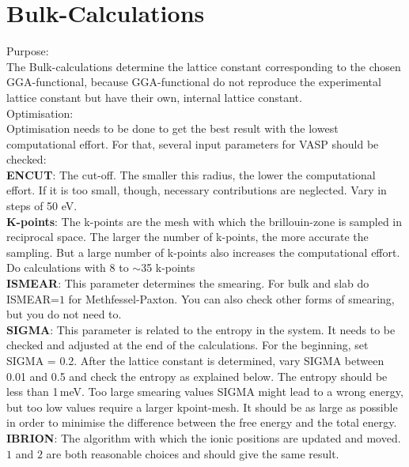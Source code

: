 \documentclass[11pt,oneside,a4paper, captions=nooneline, headsepline]{article}%
\begin{document}
\section{Bulk-Calculations}
\label{bulk}
Purpose:\\
The Bulk-calculations determine the lattice constant corresponding to the chosen GGA-functional, because GGA-functional do not reproduce the experimental lattice constant but have their own, internal lattice constant.\\
Optimisation:\\
Optimisation needs to be done to get the best result with the lowest computational effort. For that, several input parameters for VASP should be checked:\\
\textbf{ENCUT}: The cut-off. The smaller this radius, the lower the computational effort. If it is too small, though, necessary contributions are neglected. Vary in steps of 50 eV.\\
\textbf{K-points}: The k-points are the mesh with which the brillouin-zone is sampled in reciprocal space. The larger the number of k-points, the more accurate the sampling. But a large number of k-points also increases the computational effort. Do calculations with 8 to $\sim$35 k-points\\
\textbf{ISMEAR}: This parameter determines the smearing. For bulk and slab do ISMEAR=$1$ for Methfessel-Paxton. You can also check other forms of smearing, but you do not need to.\\
\textbf{SIGMA}: This parameter is related to the entropy in the system. It needs to be checked and adjusted at the end of the calculations. For the beginning, set SIGMA = 0.2. After the lattice constant is determined, vary SIGMA between 0.01 and 0.5 and check the entropy as explained below. The entropy should be less than 1\,meV. Too large smearing values SIGMA might lead to a wrong energy, but too low values require a larger kpoint-mesh. It should be as large as possible in order to minimise the difference between the free energy and the total energy.\\
\textbf{IBRION}: The algorithm with which the ionic positions are updated and moved. $1$ and $2$ are both reasonable choices and should give the same result.\\
\end{document}
